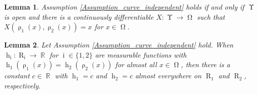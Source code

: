 \documentclass[10pt,a4paper]{amsart}
\newtheorem{lemma}{Lemma}
\DeclareMathOperator{\RR}{{\mathbb{R}}}
\DeclareMathOperator{\Xgroundset}{\Upsilon}
\DeclareMathOperator{\imgdom}{{\Omega}}
\DeclareMathOperator{\projvariable}{i}
\DeclareMathOperator{\raygroundset}{R}
\DeclareMathOperator{\rayinverse}{\rho}
\DeclareMathOperator{\stripfkt}{h}
\begin{document}
\begin{lemma} \label{lemma_X_exists}
Assumption \ref{Assumption_curve_independent} holds if and only if $\Xgroundset$ is open and
there is a continuously differentiable $X\colon \Xgroundset\to \imgdom$ such that $X(\rayinverse_1(x),\rayinverse_2(x))=x$ for $x\in \imgdom$. 
\end{lemma}

\begin{lemma}
\label{lemma_connected_separation}
Let Assumption \ref{Assumption_curve_independent}  hold. When $\stripfkt_{\projvariable}\colon \raygroundset_{\projvariable} \to \RR$ for $\projvariable\in \{1,2\}$ are measurable functions with $\stripfkt_1(\rayinverse_1(x))=\stripfkt_2( \rayinverse_2(x))$ for almost all $x\in \imgdom$, then there is a constant $c\in \RR$ with $\stripfkt_1=c$  and $\stripfkt_2=c$ almost everywhere on $\raygroundset_1$ and $\raygroundset_2$, respectively.
\end{lemma}
\end{document}
